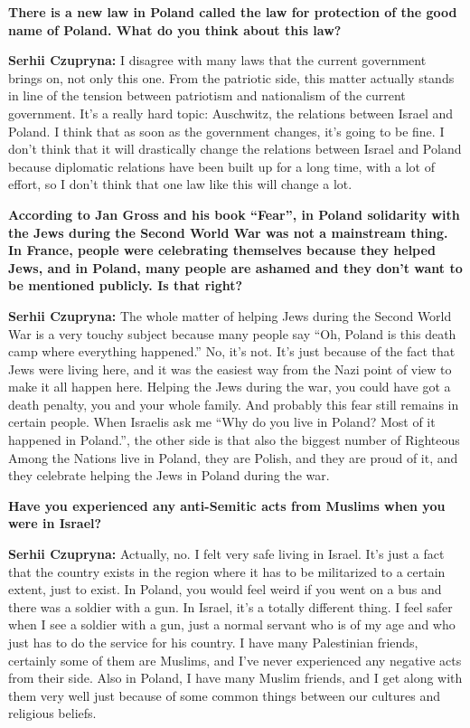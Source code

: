 \textbf{There is a new law in Poland called the law for protection of the good name of Poland. What do you think about this law?} \par
\textbf{Serhii Czupryna:} I disagree with many laws that the current government brings on, not only this one. From the patriotic side, this matter actually stands in line of the tension between patriotism and nationalism of the current government. It’s a really hard topic: Auschwitz, the relations between Israel and Poland. I think that as soon as the government changes, it’s going to be fine. I don’t think that it will drastically change the relations between Israel and Poland because diplomatic relations have been built up for a long time, with a lot of effort, so I don’t think that one law like this will change a lot.\par
\textbf{According to Jan Gross and his book ``Fear'', in Poland solidarity with the Jews during the Second World War was not a mainstream thing. In France, people were celebrating themselves because they helped Jews, and in Poland, many people are ashamed and they don’t want to be mentioned publicly. Is that right?}\par
\textbf{Serhii Czupryna:} The whole matter of helping Jews during the Second World War is a very touchy subject because many people say ``Oh, Poland is this death camp where everything happened.'' No, it’s not. It’s just because of the fact that Jews were living here, and it was the easiest way from the Nazi point of view to make it all happen here. Helping the Jews during the war, you could have got a death penalty, you and your whole family. And probably this fear still remains in certain people. When Israelis ask me ``Why do you live in Poland? Most of it happened in Poland.'', the other side is that also the biggest number of Righteous Among the Nations live in Poland, they are Polish, and they are proud of it, and they celebrate helping the Jews in Poland during the war.\par
\textbf{Have you experienced any anti-Semitic acts from Muslims when you were in Israel?}\par
\textbf{Serhii Czupryna:} Actually, no. I felt very safe living in Israel. It’s just a fact that the country exists in the region where it has to be militarized to a certain extent, just to exist. In Poland, you would feel weird if you went on a bus and there was a soldier with a gun. In Israel, it’s a totally different thing. I feel safer when I see a soldier with a gun, just a normal servant who is of my age and who just has to do the service for his country. I have many Palestinian friends, certainly some of them are Muslims, and I’ve never experienced any negative acts from their side. Also in Poland, I have many Muslim friends, and I get along with them very well just because of some common things between our cultures and religious beliefs. \par 
